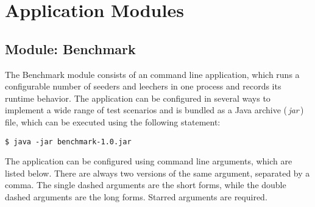 \chapter{Application Modules}
\label{ch:app}

\section{Module: Benchmark}
\label{sec:benchmark}

The Benchmark module consists of an command line application, which runs a configurable number of seeders and leechers in one process and records its runtime behavior. The application can be configured in several ways to implement a wide range of test scenarios and is bundled as a Java archive (\,\emph{jar}\,) file, which can be executed using the following statement:

\begin{verbatim}
$ java -jar benchmark-1.0.jar
\end{verbatim}

The application can be configured using command line arguments, which are listed below. There are always two versions of the same argument, separated by a comma. The single dashed arguments are the short forms, while the double dashed arguments are the long forms. Starred arguments are required.

